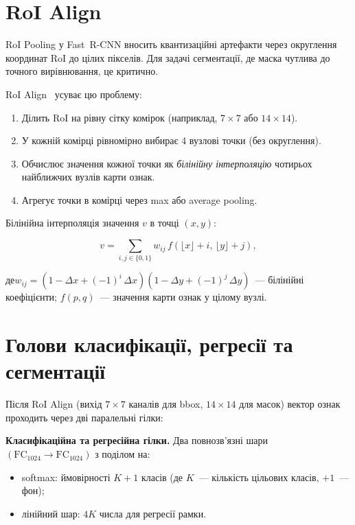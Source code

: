 \documentclass[14pt,a4paper]{extreport}
\newcommand{\where}{\par\noindent де\quad}
\begin{document}
\section{RoI Align}

RoI Pooling у Fast~R-CNN вносить квантизаційні артефакти через округлення
координат RoI до цілих пікселів. Для задачі сегментації, де маска чутлива
до точного вирівнювання, це критично.

RoI Align~\cite{maskrcnn2017} усуває цю проблему:

\begin{enumerate}
  \item Ділить RoI на рівну сітку комірок (наприклад, $7\!\times\!7$ або
        $14\!\times\!14$).
  \item У кожній комірці рівномірно вибирає 4 вузлові точки (без
        округлення).
  \item Обчислює значення кожної точки як \emph{білінійну інтерполяцію}
        чотирьох найближчих вузлів карти ознак.
  \item Агрегує точки в комірці через max або average pooling.
\end{enumerate}

Білінійна інтерполяція значення $v$ в точці $(x, y)$:

\begin{equation}
  v = \sum_{i,j\in\{0,1\}} w_{ij}\,f\!\left(\lfloor x\rfloor+i,\,
      \lfloor y\rfloor+j\right),
  \label{eq:bilinear}
\end{equation}

\where $w_{ij} = (1-\Delta x + (-1)^i\,\Delta x)(1-\Delta y+(-1)^j\,\Delta y)$~---
білінійні коефіцієнти; $f(p,q)$~--- значення карти ознак у цілому вузлі.

\section{Голови класифікації, регресії та сегментації}

Після RoI Align (вихід $7\!\times\!7$ каналів для bbox, $14\!\times\!14$
для масок) вектор ознак проходить через дві паралельні гілки:

\textbf{Класифікаційна та регресійна гілки.} Два повнозв'язні шари
$(\mathrm{FC}_{1024}\to\mathrm{FC}_{1024})$ з поділом на:
\begin{itemize}
  \item softmax: ймовірності $K\!+\!1$ класів (де $K$~--- кількість
        цільових класів, $+1$~--- фон);
  \item лінійний шар: $4K$ числа для регресії рамки.
\end{itemize}
\end{document}
